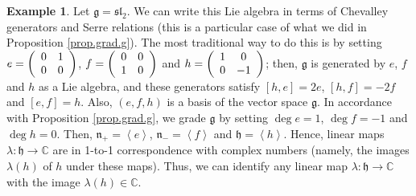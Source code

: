 \documentclass
[numbers=enddot,12pt,final,onecolumn,german,notitlepage]{scrartcl}%
\theoremstyle{definition}
\newtheorem{example}[theo]{Example}
\begin{document}
\begin{example}
\label{exa.sl2}Let $\mathfrak{g}=\mathfrak{sl}_{2}$. We can write this Lie
algebra in terms of Chevalley generators and Serre relations (this is a
particular case of what we did in Proposition \ref{prop.grad.g}). The most
traditional way to do this is by setting $e=\left(
\begin{array}
[c]{cc}%
0 & 1\\
0 & 0
\end{array}
\right)  $, $f=\left(
\begin{array}
[c]{cc}%
0 & 0\\
1 & 0
\end{array}
\right)  $ and $h=\left(
\begin{array}
[c]{cc}%
1 & 0\\
0 & -1
\end{array}
\right)  $; then, $\mathfrak{g}$ is generated by $e$, $f$ and $h$ as a Lie
algebra, and these generators satisfy $\left[  h,e\right]  =2e$, $\left[
h,f\right]  =-2f$ and $\left[  e,f\right]  =h$. Also, $\left(  e,f,h\right)  $
is a basis of the vector space $\mathfrak{g}$. In accordance with Proposition
\ref{prop.grad.g}, we grade $\mathfrak{g}$ by setting $\deg e=1$, $\deg f=-1$
and $\deg h=0$. Then, $\mathfrak{n}_{+}=\left\langle e\right\rangle $,
$\mathfrak{n}_{-}=\left\langle f\right\rangle $ and $\mathfrak{h}=\left\langle
h\right\rangle $. Hence, linear maps $\lambda:\mathfrak{h}\rightarrow
\mathbb{C}$ are in 1-to-1 correspondence with complex numbers (namely, the
images $\lambda\left(  h\right)  $ of $h$ under these maps). Thus, we can
identify any linear map $\lambda:\mathfrak{h}\rightarrow\mathbb{C}$ with the
image $\lambda\left(  h\right)  \in\mathbb{C}$.


\end{example}
\end{document}
